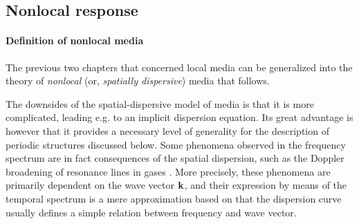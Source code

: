 
\subsection{Nonlocal response} 
\paragraph{Definition of nonlocal media}%
The previous two chapters that concerned local media can be generalized into the theory of \textit{nonlocal} (or, \textit{spatially dispersive}) media that follows.

The downsides of the spatial-dispersive model of media is that it is more complicated, leading e.g. to an implicit dispersion equation. Its great advantage is however that it provides a necessary level of generality for the description of periodic structures discussed below. 
Some phenomena observed in the frequency spectrum are in fact consequences of the spatial dispersion, such as the Doppler broadening of resonance lines in gases \cite[p. 359]{landau1984electrodynamics}. More precisely, these phenomena are primarily dependent on the wave vector ${\mathbf{k}}$, and their expression by means of the temporal spectrum is a mere approximation based on that the dispersion curve usually defines a simple relation between  frequency and wave vector.  %

